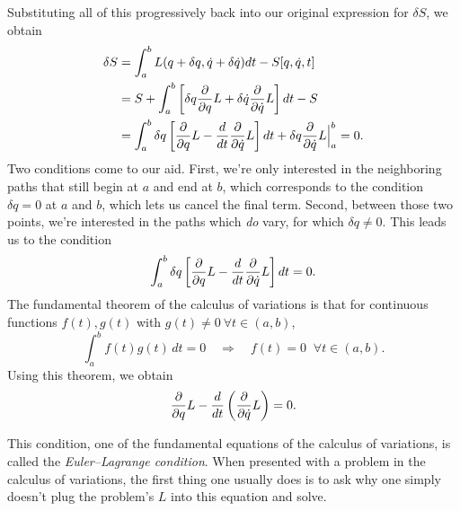 \documentclass[12pt]{article}
\newcommand{\md}{d}
\newcommand{\mderiv}[1]{\frac{\md}{\md {#1}}} %
\newcommand{\mvar}{t}
\begin{document}
Substituting all of this progressively back into our original expression for $\delta S$, we obtain
\begin{align*}
\delta S 
&= \int_{a}^{b} L(q + \delta q,\dot{q} + \delta \dot{q}) \md \mvar - S[q, \dot{q}, \mvar]\\
&= S + \int_{a}^{b} \left[\delta q \mpderiv{q}L + \delta \dot{q} \mpderiv{\dot{q}}L \right]\md \mvar - S\\
&= \int_{a}^{b} \delta q \left[ \mpderiv{q} L - \mderiv{\mvar}{\mpderiv{\dot{q}} L}\right] \md \mvar + \delta q \mpderiv{\dot{q}} L \Big|_{a}^{b} = 0.
\end{align*}
Two conditions come to our aid.  First, we're only interested in the neighboring paths that still begin at $a$ and end at $b$, which corresponds to the condition $\delta q = 0$ at $a$ and $b$, which lets us cancel the final term.  Second, between those two points, we're interested in the paths which \emph{do} vary, for which $\delta q \neq 0$.
This leads us to the condition
\begin{equation}
\int_{a}^{b} \delta q \left[ \mpderiv{q} L - \mderiv{\mvar}{\mpderiv{\dot{q}} L}\right] \md \mvar = 0.
\end{equation}
The fundamental theorem of the calculus of variations is that for continuous functions $f(t), g(t)$ with $g(t) \ne 0\ \forall t \in (a,b)$,
\begin{equation}
\int_{a}^{b} f(t) g(t)\,dt = 0 \quad \Longrightarrow \quad f(t) = 0 \;\; \forall t \in (a,b).
\end{equation}
Using this theorem, we obtain
\begin{equation}
\mpderiv{q} L - \mderiv{\mvar}\left(\mpderiv{\dot{q}} L\right) = 0.
\end{equation}

This condition, one of the fundamental equations of the calculus of variations, is called the \emph{Euler--Lagrange condition}.  When presented with a problem in the calculus of variations, the first thing one usually does is to ask why one simply doesn't plug the problem's $L$ into this equation and solve.
\end{document}
